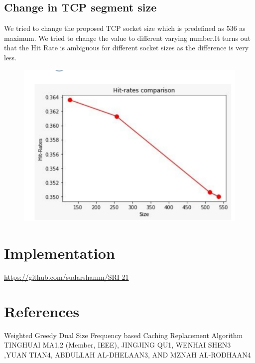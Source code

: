 \documentclass[conference]{IEEEtran}
\begin{document}
\subsection{Change in TCP segment size}
We tried to change the proposed TCP socket size which is predefined as 536 as maximum. We tried to change the value to different varying number.It turns out that the Hit Rate is ambiguous for different socket sizes as the difference is very less.


\begin{figure}[htbp]
\centerline{\includegraphics[width = 0.8\linewidth]{tcp.png}}
\caption{}
\label{fig}
\end{figure}

\section{Implementation}

\hyperlink{Source Code : }{https://github.com/sudarshannn/SRI-21}

\section{References}
Weighted Greedy Dual Size Frequency
based Caching Replacement Algorithm 
TINGHUAI MA1,2 (Member, IEEE), JINGJING QU1, WENHAI SHEN3 ,YUAN TIAN4, ABDULLAH AL-DHELAAN3, AND MZNAH AL-RODHAAN4
\end{document}
